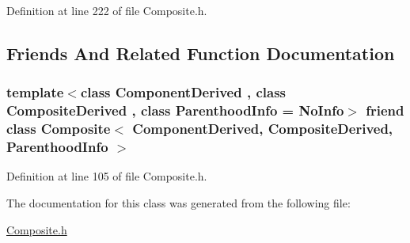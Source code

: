 Definition at line 222 of file Composite.\+h.



\subsection{Friends And Related Function Documentation}
\subsubsection[{\texorpdfstring{Composite$<$ Component\+Derived, Composite\+Derived, Parenthood\+Info $>$}{Composite< ComponentDerived, CompositeDerived, ParenthoodInfo >}}]{\setlength{\rightskip}{0pt plus 5cm}template$<$class Component\+Derived , class Composite\+Derived , class Parenthood\+Info  = No\+Info$>$ friend class {\bf Composite}$<$ Component\+Derived, Composite\+Derived, Parenthood\+Info $>$\hspace{0.3cm}{\ttfamily [friend]}}\hypertarget{classocra_1_1Parenthood_a157fe78169803ffbbb7290a687e96f5e}{}\label{classocra_1_1Parenthood_a157fe78169803ffbbb7290a687e96f5e}


Definition at line 105 of file Composite.\+h.



The documentation for this class was generated from the following file\+:\begin{DoxyCompactItemize}
\item 
\hyperlink{Composite_8h}{Composite.\+h}\end{DoxyCompactItemize}
